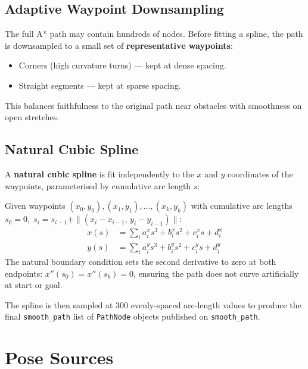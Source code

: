 \documentclass[12pt,a4paper]{article}
\begin{document}
\subsection{Adaptive Waypoint Downsampling}

The full A* path may contain hundreds of nodes. Before fitting a spline,
the path is downsampled to a small set of \textbf{representative waypoints}:

\begin{itemize}
  \item Corners (high curvature turns) --- kept at dense spacing.
  \item Straight segments --- kept at sparse spacing.
\end{itemize}

This balances faithfulness to the original path near obstacles with
smoothness on open stretches.

\subsection{Natural Cubic Spline}

A \textbf{natural cubic spline} is fit independently to the $x$ and $y$
coordinates of the waypoints, parameterised by cumulative arc length $s$:

\begin{tcolorbox}[formulabox, title={Cubic Spline Parameterisation}]
Given waypoints $(x_0, y_0), (x_1, y_1), \ldots, (x_k, y_k)$ with
cumulative arc lengths $s_0 = 0,\; s_i = s_{i-1} + \|(x_i - x_{i-1},\, y_i - y_{i-1})\|$:
\begin{align}
  x(s) &= \sum_{i} a^x_i s^3 + b^x_i s^2 + c^x_i s + d^x_i \\
  y(s) &= \sum_{i} a^y_i s^3 + b^y_i s^2 + c^y_i s + d^y_i
\end{align}
The natural boundary condition sets the second derivative to zero at
both endpoints: $x''(s_0) = x''(s_k) = 0$, ensuring the path
does not curve artificially at start or goal.
\end{tcolorbox}

The spline is then sampled at 300 evenly-spaced arc-length values to produce
the final \texttt{smooth\_path} list of \texttt{PathNode} objects published
on \texttt{smooth\_path}.

\section{Pose Sources}
\end{document}
